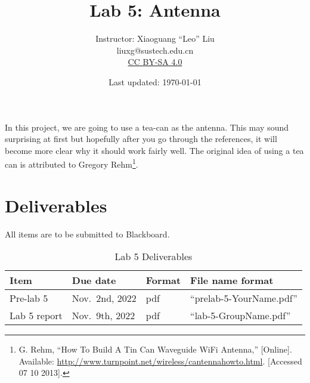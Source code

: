 \documentclass[letterpaper, 11pt]{article}
\begin{document}
\title{Lab 5: Antenna}
\author{Instructor: Xiaoguang ``Leo'' Liu\\liuxg@sustech.edu.cn \\
	\small \href{http://creativecommons.org/licenses/by-sa/4.0/}{CC BY-SA 4.0}}
\date{Last updated: \today}

\maketitle

In this project, we are going to use a tea-can as the antenna. This may sound surprising at first but hopefully after you go through the references, it will become more clear why it should work fairly well. The original idea of using a tea can is attributed to Gregory Rehm\footnote{G. Rehm, ``How To Build A Tin Can Waveguide WiFi Antenna,'' [Online]. Available: \url{http://www.turnpoint.net/wireless/cantennahowto.html}. [Accessed 07 10 2013].}. 

		
		
%


\section{Deliverables}
All items are to be submitted to Blackboard.


\begin{table}[h]
	\footnotesize
	\caption{Lab 5 Deliverables}
	\renewcommand{\arraystretch}{1.2}
	\begin{tabular}{m{1in} l m{0.45in} m{2in} }
		\toprule
		\textbf{Item} & \textbf{Due date} & \textbf{Format} & \textbf{File name format} \\
		\midrule
		Pre-lab 5 & Nov.~2nd, 2022 & pdf & ``prelab-5-YourName.pdf''\\
		Lab 5 report & Nov.~9th, 2022 & pdf & ``lab-5-GroupName.pdf''\\
		\bottomrule
	\end{tabular}
	\label{tab:deliverables}
\end{table}
\end{document}
